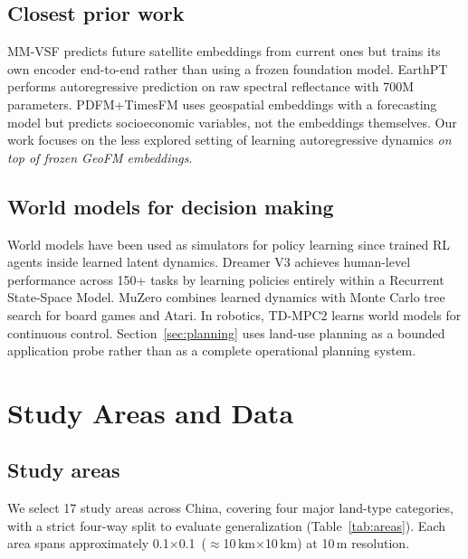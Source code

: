 \documentclass{article}
\begin{document}
\subsection{Closest prior work}

MM-VSF \citep{mmvsf2024} predicts future satellite embeddings from current ones but trains its own encoder end-to-end rather than using a frozen foundation model. EarthPT \citep{smith2023earthpt} performs autoregressive prediction on raw spectral reflectance with 700M parameters. PDFM+TimesFM \citep{google2024pdfm} uses geospatial embeddings with a forecasting model but predicts socioeconomic variables, not the embeddings themselves. Our work focuses on the less explored setting of learning autoregressive dynamics \textit{on top of frozen GeoFM embeddings}.

\subsection{World models for decision making}

World models have been used as simulators for policy learning since \citet{ha2018world} trained RL agents inside learned latent dynamics. Dreamer V3 \citep{hafner2023dreamerv3} achieves human-level performance across 150+ tasks by learning policies entirely within a Recurrent State-Space Model. MuZero \citep{schrittwieser2020muzero} combines learned dynamics with Monte Carlo tree search for board games and Atari. In robotics, TD-MPC2 \citep{hansen2024tdmpc2} learns world models for continuous control. Section~\ref{sec:planning} uses land-use planning as a bounded application probe rather than as a complete operational planning system.


\section{Study Areas and Data}
\label{sec:data}

\subsection{Study areas}

We select 17 study areas across China, covering four major land-type categories, with a strict four-way split to evaluate generalization (Table~\ref{tab:areas}). Each area spans approximately 0.1\textdegree$\times$0.1\textdegree\ ($\approx$10\,km$\times$10\,km) at 10\,m resolution.
\end{document}
